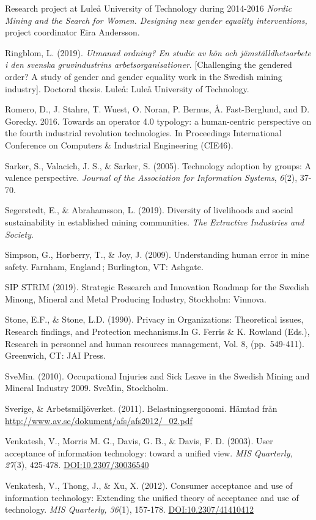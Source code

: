 \documentclass[
  12pt,
]{scrbook}
\begin{document}
Research project at Luleå University of Technology during 2014-2016
\emph{Nordic Mining and the Search for Women. Designing new gender equality
interventions,} project coordinator Eira Andersson.

Ringblom, L. (2019). \emph{Utmanad ordning? En studie av kön och
jämställdhetsarbete i den svenska gruvindustrins arbetsorganisationer}.
{[}Challenging the gendered order? A study of gender and gender equality
work in the Swedish mining industry{]}. Doctoral thesis. Luleå: Luleå
University of Technology.

Romero, D., J. Stahre, T. Wuest, O. Noran, P. Bernus, Å. Fast-Berglund,
and D. Gorecky. 2016. Towards an operator 4.0 typology: a human-centric
perspective on the fourth industrial revolution technologies. In
Proceedings International Conference on Computers \& Industrial
Engineering (CIE46).

Sarker, S., Valacich, J. S., \& Sarker, S. (2005). Technology adoption by
groups: A valence perspective. \emph{Journal of the Association for
Information Systems}, \emph{6}(2), 37-70.

Segerstedt, E., \& Abrahamsson, L. (2019). Diversity of livelihoods and
social sustainability in established mining communities. \emph{The Extractive
Industries and Society}.

Simpson, G., Horberry, T., \& Joy, J. (2009). Understanding human error
in mine safety. Farnham, England\,; Burlington, VT: Ashgate.

SIP STRIM (2019). Strategic Research and Innovation Roadmap for the
Swedish Minong, Mineral and Metal Producing Industry, Stockholm:
Vinnova.

Stone, E.F., \& Stone, L.D. (1990). Privacy in Organizations: Theoretical
issues, Research findings, and Protection mechanisms.In G. Ferris \& K.
Rowland (Eds.), Research in personnel and human resources management,
Vol. 8, (pp.~549-411). Greenwich, CT: JAI Press.

SveMin. (2010). Occupational Injuries and Sick Leave in the Swedish
Mining and Mineral Industry 2009. SveMin, Stockholm.

Sverige, \& Arbetsmiljöverket. (2011). Belastningsergonomi. Hämtad från
\url{http://www.av.se/dokument/afs/afs2012/_02.pdf}

Venkatesh, V., Morris M. G., Davis, G. B., \& Davis, F. D. (2003). User
acceptance of information technology: toward a unified view. \emph{MIS
Quarterly, 27}(3), 425-478. \url{DOI:10.2307/30036540}

Venkatesh, V., Thong, J., \& Xu, X. (2012). Consumer acceptance and use
of information technology: Extending the unified theory of acceptance
and use of technology. \emph{MIS Quarterly, 36}(1), 157-178.
\url{DOI:10.2307/41410412}
\end{document}
